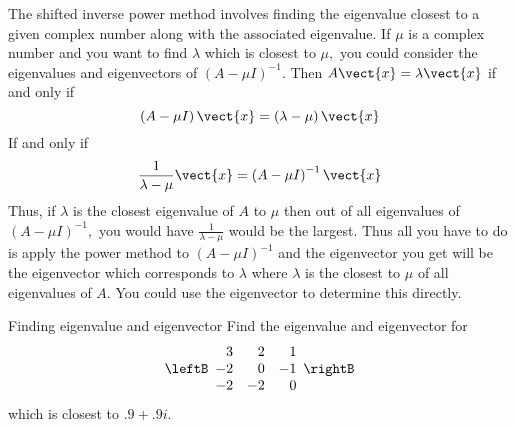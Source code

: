The shifted inverse power method involves finding the eigenvalue closest to
a given complex number along with the associated eigenvalue. If $\mu $ is a
complex number and you want to find $\lambda $ which is closest to $\mu ,$
you could consider the eigenvalues and eigenvectors of $\left( A-\mu
I\right) ^{-1}$. Then $A\vect{x}=\lambda \vect{x}$ if and only if 
\begin{equation*}
\left( A-\mu I\right) \vect{x}=\left( \lambda -\mu \right) \vect{x}
\end{equation*}
If and only if 
\begin{equation*}
\frac{1}{\lambda -\mu }\vect{x}=\left( A-\mu I\right) ^{-1}\vect{x}
\end{equation*}
Thus, if $\lambda $ is the closest eigenvalue of $A$ to $\mu $ then out of
all eigenvalues of $\left( A-\mu I\right) ^{-1},$ you would have $\frac{1}{
\lambda -\mu }$ would be the largest. Thus all you have to do is apply the
power method to $\left( A-\mu I\right) ^{-1}$ and the eigenvector you get
will be the eigenvector which corresponds to $\lambda $ where $\lambda $ is
the closest to $\mu $ of all eigenvalues of $A$. You could use the
eigenvector to determine this directly.

\begin{example}{Finding eigenvalue and eigenvector}{}
Find the eigenvalue and eigenvector for 
\begin{equation*}
\leftB 
\begin{array}{rrr}
3 & 2 & 1 \\ 
-2 & 0 & -1 \\ 
-2 & -2 & 0
\end{array}
\rightB
\end{equation*}
which is closest to $.9+.9i$.
\end{example}

